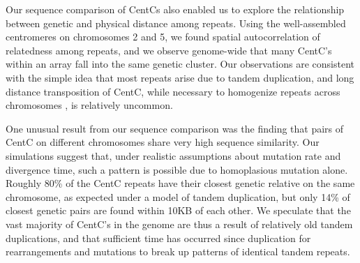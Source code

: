 

Our sequence comparison of CentCs also enabled us to explore the relationship between genetic and physical distance among repeats.  
Using the well-assembled centromeres on chromosomes 2 and 5, we found spatial autocorrelation of relatedness among repeats, and we observe genome-wide that many CentC’s within an array fall into the same genetic cluster.  
Our observations are consistent with the simple idea that most repeats arise due to tandem duplication, and long distance transposition of CentC, while necessary to homogenize repeats across chromosomes \citep{Shi2010}, is relatively uncommon.

One unusual result from our sequence comparison was the finding that pairs of CentC on different chromosomes share very high sequence similarity.  
Our simulations suggest that, under realistic assumptions about mutation rate and divergence time, such a pattern is possible due to homoplasious mutation alone.  
Roughly 80\% of the CentC repeats have their closest genetic relative on the same chromosome, as expected under a model of tandem duplication, but only 14\% of closest genetic pairs are found within 10KB of each other.
We speculate that the vast majority of  CentC’s in the genome are thus a result of relatively old tandem duplications, and that sufficient time has occurred since duplication for rearrangements and mutations to break up patterns of identical tandem repeats.
 


